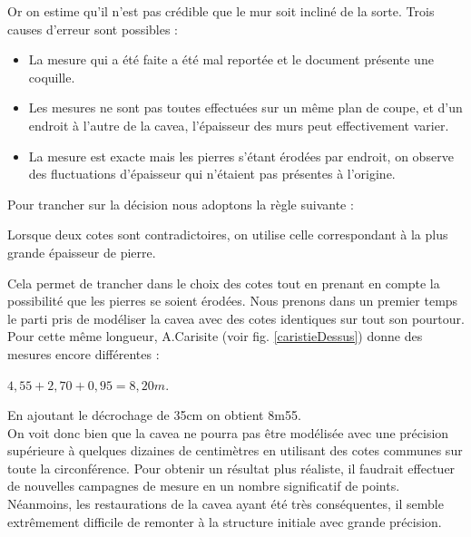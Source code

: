 Or on estime qu'il n'est pas crédible que le mur soit incliné de la sorte. Trois causes d'erreur sont possibles :
\begin{itemize}
	\item La mesure qui a été faite a été mal reportée et le document présente une coquille.
	\item Les mesures ne sont pas toutes effectuées sur un même plan de coupe, et d'un endroit à l'autre de la  \gls{cavea}, l'épaisseur des murs peut effectivement varier.
	\item La mesure est exacte mais les pierres s'étant érodées par endroit, on observe des fluctuations d'épaisseur qui n'étaient pas présentes à l'origine.
\end{itemize}
%
Pour trancher sur la décision nous adoptons la règle suivante :
%
\begin{theo}\label{epaisseur}
	Lorsque deux cotes sont contradictoires, on utilise celle correspondant à la plus grande épaisseur de pierre.
\end{theo}
%
Cela permet de trancher dans le choix des cotes tout en prenant en compte la possibilité que les pierres se soient érodées. Nous prenons dans un premier temps le parti pris de modéliser la  \gls{cavea} avec des cotes identiques sur tout son pourtour. Pour cette même longueur, A.Carisite (voir fig. \ref{caristieDessus}) donne des mesures encore différentes : 
\begin{center}
$4,55+2,70+0,95=8,20m$.
\end{center}
En ajoutant le décrochage de 35cm on obtient 8m55. \\

On voit donc bien que la \gls{cavea} ne pourra pas être modélisée avec une précision supérieure à quelques dizaines de centimètres en utilisant des cotes communes sur toute la circonférence. Pour obtenir un résultat plus réaliste, il faudrait effectuer de nouvelles campagnes de mesure en un nombre significatif de points. Néanmoins, les restaurations de la \gls{cavea} ayant été très conséquentes, il semble extrêmement difficile de remonter à la structure initiale avec grande précision.

